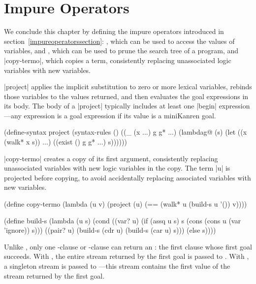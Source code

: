 \section{Impure Operators}
\enlargethispage{1em}

We conclude this chapter by defining the impure operators introduced
in section~\ref{impureoperatorssection}: , which can
be used to access the values of variables,  and
, which can be used to prune the search tree of a
program, and \scheme|copy-termo|, which copies a term, consistently
replacing unassociated logic variables with new variables.

\scheme|project| applies the implicit substitution to zero or more
lexical variables, rebinds those variables to the values returned, and
then evaluates the goal expressions in its body.  The body of a
\scheme|project| typically includes at least one \scheme|begin|
expression---any expression is a goal expression if its value is a
miniKanren goal.

\schemedisplayspace
\begin{schemedisplay}
(define-syntax project 
  (syntax-rules ()                                                
    ((_ (x ...) g g* ...)  
     (lambdag@ (s)
       (let ((x (walk* x s)) ...)
         ((exist () g g* ...) s))))))
\end{schemedisplay}


\scheme|copy-termo| creates a copy of its first argument, consistently
replacing unassociated variables with new logic variables in the copy.
The term \scheme|u| is projected before copying, to avoid accidentally
replacing associated variables with new variables.

\schemedisplayspace
\begin{schemedisplay}
(define copy-termo
  (lambda (u v)
    (project (u)
      (== (walk* u (build-s u '()) v))))

(define build-s
  (lambda (u s)
    (cond
      ((var? u) (if (assq u s) s (cons (cons u (var 'ignore)) s)))
      ((pair? u) (build-s (cdr u) (build-s (car u) s)))
      (else s))))
\end{schemedisplay}

Unlike , only one -clause or
-clause can return an : the first clause
whose first goal succeeds.  With , the entire stream
returned by the first goal is passed to .  With
, a singleton stream is passed to ---this
stream contains the first value of the stream returned by the first
goal.

